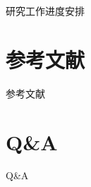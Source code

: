 \documentclass[mathserif,compress,CJKutf8, red]{beamer}
\newcommand{\xiaochuhao}{\fontsize{36pt}{\baselineskip}\selectfont} %
\begin{document}
\begin{CJK*}{UTF8}{song}
\begin{frame}{研究工作进度安排}
\end{frame}

\section{参考文献}

\begin{frame}[allowframebreaks]{参考文献}
\tiny


\end{frame}

\section*{Q\&A}

\begin{frame}{Q\&A}
\begin{block}{}
\centerline{\xiaochuhao{谢谢}}
\end{block}
\end{frame}
\end{CJK*}
\end{document}
